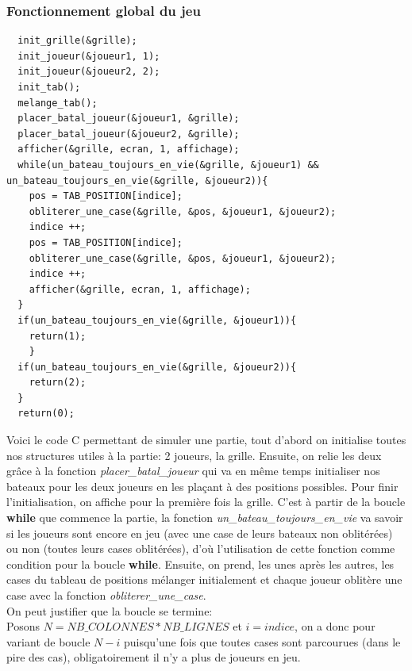 \subsubsection{Fonctionnement global du jeu}
\begin{lstlisting}
  init_grille(&grille);
  init_joueur(&joueur1, 1);
  init_joueur(&joueur2, 2);
  init_tab();
  melange_tab();
  placer_batal_joueur(&joueur1, &grille);
  placer_batal_joueur(&joueur2, &grille);
  afficher(&grille, ecran, 1, affichage);
  while(un_bateau_toujours_en_vie(&grille, &joueur1) && un_bateau_toujours_en_vie(&grille, &joueur2)){
    pos = TAB_POSITION[indice];
    obliterer_une_case(&grille, &pos, &joueur1, &joueur2);
    indice ++;
    pos = TAB_POSITION[indice];
    obliterer_une_case(&grille, &pos, &joueur1, &joueur2);
    indice ++;
    afficher(&grille, ecran, 1, affichage);
  }
  if(un_bateau_toujours_en_vie(&grille, &joueur1)){
    return(1);
    }
  if(un_bateau_toujours_en_vie(&grille, &joueur2)){
    return(2);
  }
  return(0);
\end{lstlisting}
Voici le code C permettant de simuler une partie, tout d'abord on initialise toutes nos structures utiles à la partie: 2 joueurs, la grille. Ensuite, on relie les deux grâce à la fonction \textit{placer\_batal\_joueur} qui va en même temps initialiser nos bateaux pour les deux joueurs en les plaçant à des positions possibles. Pour finir l'initialisation, on affiche pour la première fois la grille. C'est à partir de la boucle \textbf{while} que commence la partie, la fonction \textit{un\_bateau\_toujours\_en\_vie} va savoir si les joueurs sont encore en jeu (avec une case de leurs bateaux non oblitérées) ou non (toutes leurs cases oblitérées), d'où l'utilisation de cette fonction comme condition pour la boucle \textbf{while}. Ensuite, on prend, les unes après les autres, les cases du tableau de positions mélanger initialement et chaque joueur oblitère une case avec la fonction \textit{obliterer\_une\_case}. \\
On peut justifier que la boucle se termine:\\
Posons $N=NB\_COLONNES*NB\_LIGNES$ et $i=indice$, on a donc pour variant de boucle $N-i$ puisqu'une fois que toutes cases sont parcourues (dans le pire des cas), obligatoirement il n'y a plus de joueurs en jeu.\\

